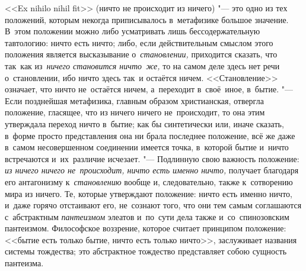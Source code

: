 <<Ex nihilo nihil fit>> (ничто не происходит из ничего) "--- это одно из тех
положений, которым некогда приписывалось в~метафизике большое значение. В~этом
положении можно либо усматривать лишь бессодержательную тавтологию: ничто есть
ничто; либо, если действительным смыслом этого положения является высказывание
о~{\em становлении,} приходится сказать, что так~как из~{\em ничего становится
ничто~же,} то на самом деле здесь нет речи о~становлении, ибо ничто здесь так~и
остаётся ничем. <<Становление>> означает, что ничто не~остаётся ничем,
а~переходит в~своё~иное, в~бытие. "--- Если позднейшая метафизика, главным
образом христианская, отвергла положение, гласящее, что из ничего ничего
не~происходит, то она этим утверждала переход ничто в~бытие; как бы
синтетически или, иначе сказать, в~форме просто представления она ни брала
последнее положение, всё же даже в~самом несовершенном соединении имеется
точка, в~которой бытие и~ничто встречаются и~их~различие исчезает. "---
Подлинную свою важность положение: {\em из ничего ничего не~происходит, ничто
есть именно ничто,} получает благодаря его антагонизму к~{\em становлению}
вообще и, следовательно, также к~сотворению мира из ничего. Те, которые
утверждают положение: ничто есть именно ничто, и~даже горячо отстаивают его,
не~сознают того, что они тем самым соглашаются с~абстрактным {\em пантеизмом}
элеатов и~по~сути дела также и~со~спинозовским пантеизмом. Философское
воззрение, которое считает принципом положение: <<бытие есть только бытие,
ничто есть только ничто>>, заслуживает названия системы тождества; это
абстрактное тождество представляет собою сущность пантеизма.

